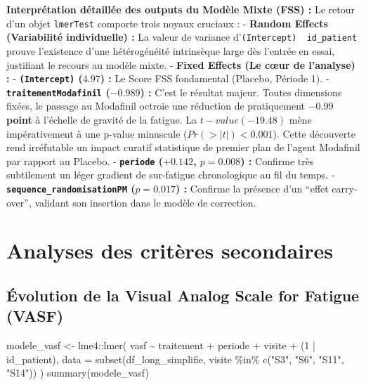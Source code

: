 \documentclass[
  letterpaper,
  DIV=11,
  numbers=noendperiod]{scrartcl}
\newenvironment{Shaded}{\begin{snugshade}}{\end{snugshade}}
\newcommand{\AttributeTok}[1]{\textcolor[rgb]{0.40,0.45,0.13}{#1}}
\newcommand{\DecValTok}[1]{\textcolor[rgb]{0.68,0.00,0.00}{#1}}
\newcommand{\FunctionTok}[1]{\textcolor[rgb]{0.28,0.35,0.67}{#1}}
\newcommand{\NormalTok}[1]{\textcolor[rgb]{0.00,0.23,0.31}{#1}}
\newcommand{\OtherTok}[1]{\textcolor[rgb]{0.00,0.23,0.31}{#1}}
\newcommand{\SpecialCharTok}[1]{\textcolor[rgb]{0.37,0.37,0.37}{#1}}
\newcommand{\StringTok}[1]{\textcolor[rgb]{0.13,0.47,0.30}{#1}}
\begin{document}
\textbf{Interprétation détaillée des outputs du Modèle Mixte (FSS) :} Le
retour d'un objet \texttt{lmerTest} comporte trois noyaux cruciaux : -
\textbf{Random Effects (Variabilité individuelle) :} La valeur de
variance d'\texttt{(Intercept)\ \textbar{}\ id\_patient} prouve
l'existence d'une hétérogénéité intrinsèque large dès l'entrée en essai,
justifiant le recours au modèle mixte. - \textbf{Fixed Effects (Le cœur
de l'analyse) :} - \textbf{\texttt{(Intercept)} (\(4.97\)) :} Le Score
FSS fondamental (Placebo, Période 1). -
\textbf{\texttt{traitementModafinil} (\(-0.989\)) :} C'est le résultat
majeur. Toutes dimensions fixées, le passage au Modafinil octroie une
réduction de pratiquement \textbf{\(-0.99\) point} à l'échelle de
gravité de la fatigue. La \(t-value (-19.48)\) mène impérativement à une
p-value minuscule (\(Pr(>|t|) < 0.001\)). Cette découverte rend
irréfutable un impact curatif statistique de premier plan de l'agent
Modafinil par rapport au Placebo. - \textbf{\texttt{periode}
(\(+0.142\), \(p = 0.008\)) :} Confirme très subtilement un léger
gradient de sur-fatigue chronologique au fil du temps. -
\textbf{\texttt{sequence\_randomisationPM} (\(p = 0.017\)) :} Confirme
la présence d'un ``effet carry-over'', validant son insertion dans le
modèle de correction.

\section{Analyses des critères
secondaires}\label{analyses-des-crituxe8res-secondaires}

\subsection{Évolution de la Visual Analog Scale for Fatigue
(VASF)}\label{uxe9volution-de-la-visual-analog-scale-for-fatigue-vasf}

\begin{Shaded}
\begin{Highlighting}[]
\NormalTok{modele\_vasf }\OtherTok{\textless{}{-}}\NormalTok{ lme4}\SpecialCharTok{::}\FunctionTok{lmer}\NormalTok{(}
\NormalTok{  vasf }\SpecialCharTok{\textasciitilde{}}\NormalTok{ traitement }\SpecialCharTok{+}\NormalTok{ periode }\SpecialCharTok{+}\NormalTok{ visite }\SpecialCharTok{+}\NormalTok{ (}\DecValTok{1} \SpecialCharTok{|}\NormalTok{ id\_patient),}
  \AttributeTok{data =} \FunctionTok{subset}\NormalTok{(df\_long\_simplifie, visite }\SpecialCharTok{\%in\%} \FunctionTok{c}\NormalTok{(}\StringTok{"S3"}\NormalTok{, }\StringTok{"S6"}\NormalTok{, }\StringTok{"S11"}\NormalTok{, }\StringTok{"S14"}\NormalTok{))}
\NormalTok{)}
\FunctionTok{summary}\NormalTok{(modele\_vasf)}
\end{Highlighting}
\end{Shaded}
\end{document}
